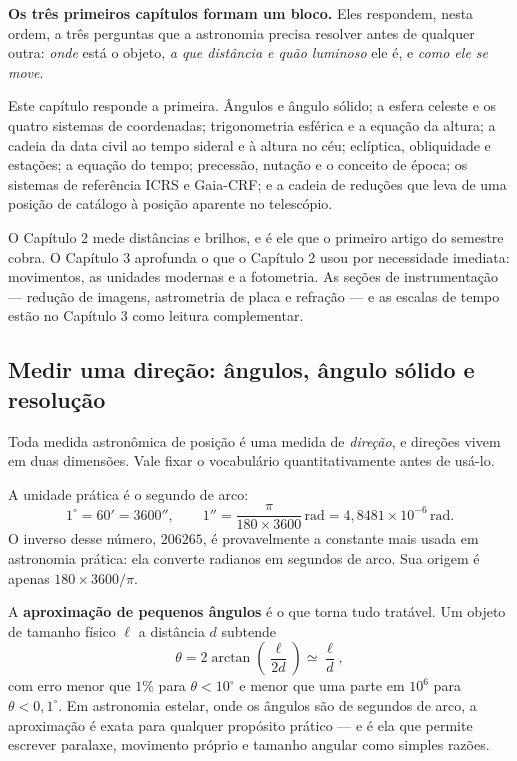 \documentclass[11pt,a4paper]{article}
\begin{document}
\begin{noticebox}
\textbf{Os três primeiros capítulos formam um bloco.} Eles respondem, nesta ordem, a três perguntas que a astronomia precisa resolver antes de qualquer outra: \emph{onde} está o objeto, \emph{a que distância e quão luminoso} ele é, e \emph{como ele se move}.

Este capítulo responde a primeira. Ângulos e ângulo sólido; a esfera celeste e os quatro sistemas de coordenadas; trigonometria esférica e a equação da altura; a cadeia da data civil ao tempo sideral e à altura no céu; eclíptica, obliquidade e estações; a equação do tempo; precessão, nutação e o conceito de época; os sistemas de referência ICRS e Gaia-CRF; e a cadeia de reduções que leva de uma posição de catálogo à posição aparente no telescópio.

O Capítulo 2 mede distâncias e brilhos, e é ele que o primeiro artigo do semestre cobra. O Capítulo 3 aprofunda o que o Capítulo 2 usou por necessidade imediata: movimentos, as unidades modernas e a fotometria. As seções de instrumentação --- redução de imagens, astrometria de placa e refração --- e as escalas de tempo estão no Capítulo 3 como leitura complementar.
\end{noticebox}

\subsection*{Medir uma direção: ângulos, ângulo sólido e resolução}

Toda medida astronômica de posição é uma medida de \emph{direção}, e direções vivem em duas dimensões. Vale fixar o vocabulário quantitativamente antes de usá-lo.

A unidade prática é o segundo de arco:
\[
1^\circ=60'=3600'',
\qquad
1''=\frac{\pi}{180\times3600}\,\mathrm{rad}=4{,}8481\times10^{-6}\,\mathrm{rad}.
\]
O inverso desse número, $206265$, é provavelmente a constante mais usada em astronomia prática: ela converte radianos em segundos de arco. Sua origem é apenas $180\times3600/\pi$.

A \textbf{aproximação de pequenos ângulos} é o que torna tudo tratável. Um objeto de tamanho físico $\ell$ a distância $d$ subtende
\[
\theta=2\arctan\left(\frac{\ell}{2d}\right)\simeq\frac{\ell}{d},
\]
com erro menor que $1\%$ para $\theta<10^\circ$ e menor que uma parte em $10^{6}$ para $\theta<0{,}1^\circ$. Em astronomia estelar, onde os ângulos são de segundos de arco, a aproximação é exata para qualquer propósito prático --- e é ela que permite escrever paralaxe, movimento próprio e tamanho angular como simples razões.
\end{document}
